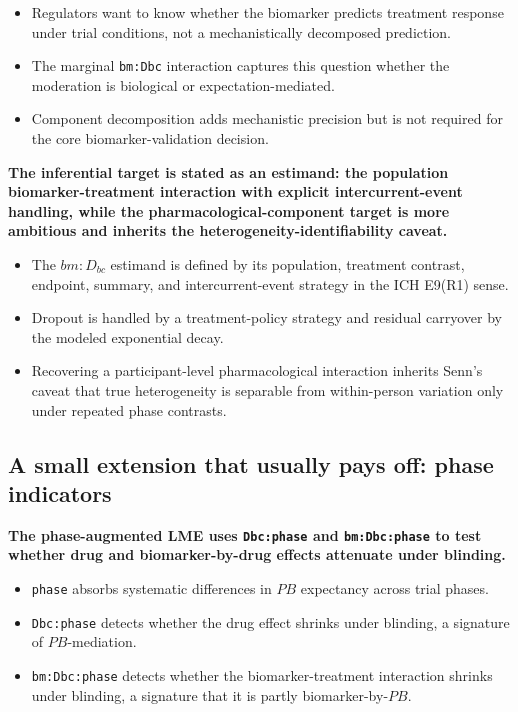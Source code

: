 \documentclass[
  11pt,
]{article}
\begin{document}
\begin{itemize}\setlength{\itemsep}{2pt}\setlength{\parskip}{0pt}
\item Regulators want to know whether the biomarker predicts treatment response under trial conditions, not a mechanistically decomposed prediction.
\item The marginal \texttt{bm:Dbc} interaction captures this question whether the moderation is biological or expectation-mediated.
\item Component decomposition adds mechanistic precision but is not required for the core biomarker-validation decision.
\end{itemize}

\textbf{The inferential target is stated as an estimand: the population biomarker-treatment interaction with explicit intercurrent-event handling, while the pharmacological-component target is more ambitious and inherits the heterogeneity-identifiability caveat.}

\begin{itemize}\setlength{\itemsep}{2pt}\setlength{\parskip}{0pt}
\item The $bm{:}D_{bc}$ estimand is defined by its population, treatment contrast, endpoint, summary, and intercurrent-event strategy in the ICH E9(R1) sense.
\item Dropout is handled by a treatment-policy strategy and residual carryover by the modeled exponential decay.
\item Recovering a participant-level pharmacological interaction inherits Senn's caveat that true heterogeneity is separable from within-person variation only under repeated phase contrasts.
\end{itemize}

\subsection{A small extension that usually pays off: phase indicators}\label{a-small-extension-that-usually-pays-off-phase-indicators}

\textbf{The phase-augmented LME uses \texttt{Dbc:phase} and \texttt{bm:Dbc:phase} to test whether drug and biomarker-by-drug effects attenuate under blinding.}

\begin{itemize}\setlength{\itemsep}{2pt}\setlength{\parskip}{0pt}
\item \texttt{phase} absorbs systematic differences in $PB$ expectancy across trial phases.
\item \texttt{Dbc:phase} detects whether the drug effect shrinks under blinding, a signature of $PB$-mediation.
\item \texttt{bm:Dbc:phase} detects whether the biomarker-treatment interaction shrinks under blinding, a signature that it is partly biomarker-by-$PB$.
\end{itemize}
\end{document}
